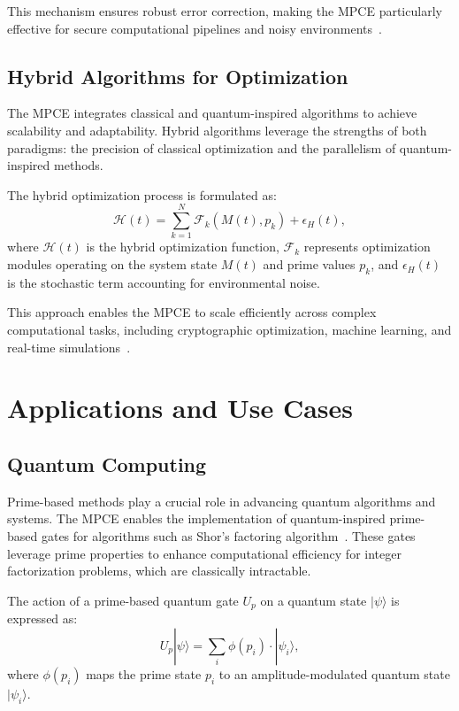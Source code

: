 \documentclass{article}
\theoremstyle{plain}
\begin{document}
This mechanism ensures robust error correction, making the MPCE particularly effective for secure computational pipelines and noisy environments~\cite{haroche2013nobel, shor1994algorithms}.

\subsection{Hybrid Algorithms for Optimization}

The MPCE integrates classical and quantum-inspired algorithms to achieve scalability and adaptability. Hybrid algorithms leverage the strengths of both paradigms: the precision of classical optimization and the parallelism of quantum-inspired methods.

The hybrid optimization process is formulated as:
\begin{equation}
    \mathcal{H}(t) = \sum_{k=1}^N \mathcal{F}_k \left( M(t), p_k \right) + \epsilon_H(t),
\end{equation}
where \( \mathcal{H}(t) \) is the hybrid optimization function, \( \mathcal{F}_k \) represents optimization modules operating on the system state \( M(t) \) and prime values \( p_k \), and \( \epsilon_H(t) \) is the stochastic term accounting for environmental noise.

This approach enables the MPCE to scale efficiently across complex computational tasks, including cryptographic optimization, machine learning, and real-time simulations~\cite{grover1996fast, wang2021quantum}.

\section{Applications and Use Cases}

\subsection{Quantum Computing}

Prime-based methods play a crucial role in advancing quantum algorithms and systems. The MPCE enables the implementation of quantum-inspired prime-based gates for algorithms such as Shor's factoring algorithm~\cite{shor1994algorithms}. These gates leverage prime properties to enhance computational efficiency for integer factorization problems, which are classically intractable.

The action of a prime-based quantum gate \( U_p \) on a quantum state \( |\psi\rangle \) is expressed as:
\begin{equation}
    U_p |\psi\rangle = \sum_{i} \phi(p_i) \cdot |\psi_i\rangle,
\end{equation}
where \( \phi(p_i) \) maps the prime state \( p_i \) to an amplitude-modulated quantum state \( |\psi_i\rangle \).
\end{document}
